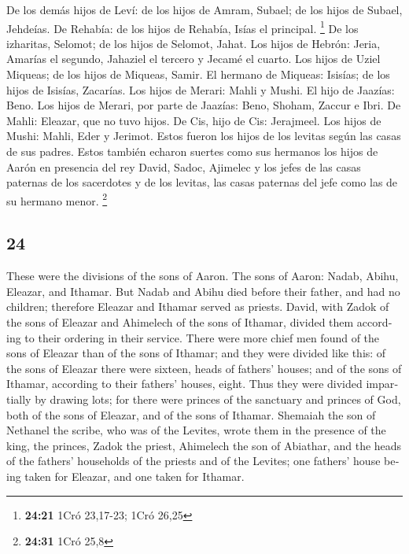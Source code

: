 \begin{paracol}{2}
 De los demás hijos de Leví: de los hijos de Amram,
Subael; de los hijos de Subael, Jehdeías.  De Rehabía: de
los hijos de Rehabía, Isías el principal. \footnote{\textbf{24:21} 1Cró
  23,17-23; 1Cró 26,25}  De los izharitas, Selomot; de
los hijos de Selomot, Jahat.  Los hijos de Hebrón: Jeria,
Amarías el segundo, Jahaziel el tercero y Jecamé el cuarto.
 Los hijos de Uziel Miqueas; de los hijos de Miqueas,
Samir.  El hermano de Miqueas: Isisías; de los hijos de
Isisías, Zacarías.  Los hijos de Merari: Mahli y Mushi.
El hijo de Jaazías: Beno.  Los hijos de Merari, por parte
de Jaazías: Beno, Shoham, Zaccur e Ibri.  De Mahli:
Eleazar, que no tuvo hijos.  De Cis, hijo de Cis:
Jerajmeel.  Los hijos de Mushi: Mahli, Eder y Jerimot.
Estos fueron los hijos de los levitas según las casas de sus padres.
 Estos también echaron suertes como sus hermanos los
hijos de Aarón en presencia del rey David, Sadoc, Ajimelec y los jefes
de las casas paternas de los sacerdotes y de los levitas, las casas
paternas del jefe como las de su hermano menor. \footnote{\textbf{24:31}
  1Cró 25,8}

\switchcolumn
\begin{otherlanguage}{english}

\hypertarget{section-47}{%
\section{24}\label{section-47}}

 These were the divisions of the sons of Aaron. The sons
of Aaron: Nadab, Abihu, Eleazar, and Ithamar.  But Nadab
and Abihu died before their father, and had no children; therefore
Eleazar and Ithamar served as priests.  David, with Zadok
of the sons of Eleazar and Ahimelech of the sons of Ithamar, divided
them according to their ordering in their service.  There
were more chief men found of the sons of Eleazar than of the sons of
Ithamar; and they were divided like this: of the sons of Eleazar there
were sixteen, heads of fathers' houses; and of the sons of Ithamar,
according to their fathers' houses, eight.  Thus they were
divided impartially by drawing lots; for there were princes of the
sanctuary and princes of God, both of the sons of Eleazar, and of the
sons of Ithamar.  Shemaiah the son of Nethanel the scribe,
who was of the Levites, wrote them in the presence of the king, the
princes, Zadok the priest, Ahimelech the son of Abiathar, and the heads
of the fathers' households of the priests and of the Levites; one
fathers' house being taken for Eleazar, and one taken for Ithamar.


\end{otherlanguage}
\end{paracol}
